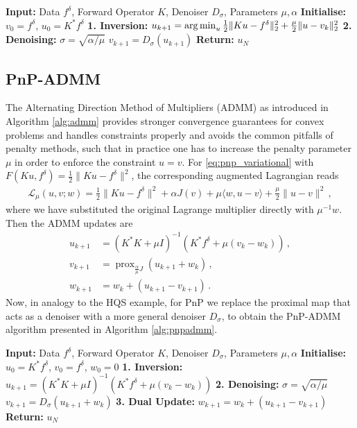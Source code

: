 \begin{algorithm}
\caption{Plug-and-Play HQS}
\begin{algorithmic}[1]
\State \textbf{Input:} Data $f^\delta$, Forward Operator $K$, Denoiser $D_\sigma$, Parameters $\mu, \alpha$
\State \textbf{Initialise:} $v_0 = f^\delta$, $u_0 = K^\ast f^\delta$
    \State
    \State \textbf{1. Inversion:}
    \State $u_{k+1} = \operatorname*{arg\,min}_u \frac{1}{2}\|Ku - f^\delta\|_2^2 + \frac{\mu}{2}\|u - v_k\|_2^2$
    \State
    \State \textbf{2. Denoising:}
    \State $\sigma = \sqrt{\alpha / \mu}$
    \State $v_{k+1} = D_{\sigma}(u_{k+1})$
    \State
\EndFor
\State \textbf{Return:} $u_{N}$
\end{algorithmic}\label{alg:pnphqs}
\end{algorithm}

\subsection{PnP-ADMM}
The Alternating Direction Method of Multipliers (ADMM) as introduced in Algorithm \ref{alg:admm} provides stronger convergence guarantees for convex problems and handles constraints properly and avoids the common pitfalls of penalty methods, such that in practice one has to increase the penalty parameter $\mu$ in order to enforce the constraint $u = v$. For \eqref{eq:pnp_variational} with $F(Ku, f^\delta) = \frac12 \| Ku - f^\delta \|^2$, the corresponding augmented Lagrangian reads
\begin{align*}
    \mathcal{L}_\mu(u, v; w) = \frac12 \| Ku - f^\delta \|^2 + \alpha J(v) + \mu \langle w, u - v \rangle + \frac{\mu}{2} \| u - v \|^2 \, ,
\end{align*}
where we have substituted the original Lagrange multiplier directly with $\mu^{-1} w$. Then the ADMM updates are
\begin{align*}
    u_{k+1} &= (K^*K + \mu I)^{-1} (K^*f^\delta + \mu (v_k -  w_k)) \, , \\
    v_{k+1} &= \operatorname{prox}_{\frac{\alpha}{\mu} J}(u_{k + 1} + w_k) \, , \\
    w_{k+1} &= w_k + (u_{k+1} - v_{k+1}) \, .
\end{align*}
Now, in analogy to the HQS example, for PnP we replace the proximal map that acts as a denoiser with a more general denoiser $D_\sigma$, to obtain the PnP-ADMM algorithm presented in Algorithm \ref{alg:pnpadmm}.
\begin{algorithm}
\caption{Plug-and-Play ADMM}
\begin{algorithmic}[1]
\State \textbf{Input:} Data $f^\delta$, Forward Operator $K$, Denoiser $D_\sigma$, Parameters $\mu, \alpha$
\State \textbf{Initialise:} $u_0 = K^\ast f^\delta$, $v_0 = f^\delta$, $w_0 = 0$
    \State
    \State \textbf{1. Inversion:}
    \State $u_{k+1} = (K^*K + \mu I)^{-1} (K^*f^\delta + \mu(v_k - w_k))$
    \State
    \State \textbf{2. Denoising:}
    \State $\sigma = \sqrt{\alpha / \mu}$
    \State $v_{k+1} = D_{\sigma}(u_{k+1} + w_k)$
    \State
    \State \textbf{3. Dual Update:}
    \State $w_{k+1} = w_k + (u_{k+1} - v_{k+1})$
    \State
\EndFor
\State \textbf{Return:} $u_{N}$
\end{algorithmic}\label{alg:pnpadmm}
\end{algorithm}
